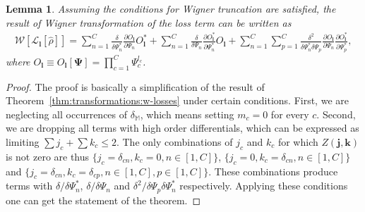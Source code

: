 \documentclass[12pt,aip,jmp,amssymb,amsmath]{revtex4-1}
\newtheorem{lemma}{Lemma}
\begin{document}
\begin{lemma}
    Assuming the conditions for Wigner truncation are satisfied, the result of Wigner transformation of the loss term can be written as
    \begin{equation*}\begin{split}
        \mathcal{W}[\mathcal{L}_{\boldsymbol{l}}[\hat{\rho}]]
        = \sum_{n=1}^C
                \frac{\delta}{\delta \Psi_n^*} \frac{\partial O_{\boldsymbol{l}}}{\partial \Psi_n} O_{\boldsymbol{l}}^*
        + \sum_{n=1}^C
            \frac{\delta}{\delta \Psi_n} \frac{\partial O_{\boldsymbol{l}}^*}{\partial \Psi_n^*} O_{\boldsymbol{l}}
        + \sum_{n=1}^C \sum_{p=1}^C
            \frac{\delta^2}{\delta \Psi_n^* \delta \Psi_p}
            \frac{\partial O_{\boldsymbol{l}}}{\partial \Psi_n}
            \frac{\partial O_{\boldsymbol{l}}^*}{\partial \Psi_p^*},
    \end{split}\end{equation*}
    where $O_{\boldsymbol{l}} \equiv O_{\boldsymbol{l}}[\boldsymbol{\Psi}] = \prod_{c=1}^C \Psi_c^{l_c}$.
\end{lemma}
\begin{proof}
The proof is basically a simplification of the result of Theorem~\ref{thm:transformations:w-losses} under certain conditions.
First, we are neglecting all occurrences of $\delta_{\mathbb{M}}$, which means setting $m_c = 0$ for every $c$.
Second, we are dropping all terms with high order differentials,
which can be expressed as limiting $\sum j_c + \sum k_c \le 2$.
The only combinations of $j_c$ and $k_c$ for which $Z(\boldsymbol{j}, \boldsymbol{k})$ is not zero are thus
$\{ j_c = \delta_{cn}, k_c = 0, n \in [1, C] \}$,
$\{ j_c = 0, k_c = \delta_{cn}, n \in [1, C] \}$ and
$\{ j_c = \delta_{cn}, k_c = \delta_{cp}, n \in [1, C], p \in [1, C] \}$.
These combinations produce terms with $\delta/\delta \Psi_n^*$,
$\delta/\delta \Psi_n$ and
$\delta^2/\delta \Psi_p \delta \Psi_n^*$ respectively.
Applying these conditions one can get the statement of the theorem.
\end{proof}
\end{document}
